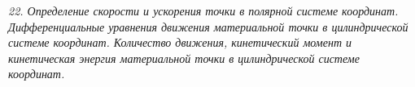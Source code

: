 \emph{22. Определение скорости и ускорения точки в полярной системе координат.
Дифференциальные уравнения движения материальной точки в цилиндрической
системе координат. Количество движения, кинетический момент и кинетическая
энергия материальной точки в цилиндрической системе координат.}

\newpage
